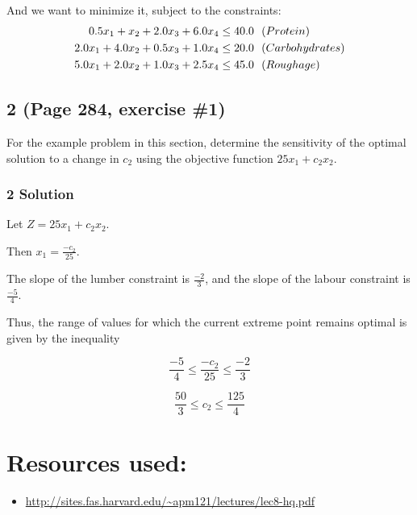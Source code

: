 \documentclass[]{article}
\providecommand{\tightlist}{%
  \setlength{\itemsep}{0pt}\setlength{\parskip}{0pt}}
\begin{document}
And we want to minimize it, subject to the constraints: \begin{align*}
0.5x_1 + x_2 + 2.0x_3 + 6.0x_4 &\leq 40.0 \ \ \text(Protein) \\
2.0x_1 + 4.0x_2 + 0.5x_3 + 1.0x_4 &\leq 20.0 \ \ \text(Carbohydrates) \\
5.0x_1 + 2.0x_2 + 1.0x_3 + 2.5x_4 &\leq 45.0 \ \ \text(Roughage)
\end{align*}

\hypertarget{page-284-exercise-1}{%
\subsection{2 (Page 284, exercise \#1)}\label{page-284-exercise-1}}

For the example problem in this section, determine the sensitivity of
the optimal solution to a change in \(c_2\) using the objective function
\(25x_1 + c_2x_2\).

\hypertarget{solution-1}{%
\subsubsection{2 Solution}\label{solution-1}}

Let \(Z = 25x_1 + c_2x_2\).

Then \(x_1 = \frac{-c_2}{25}\).

The slope of the lumber constraint is \(\frac{-2}{3}\), and the slope of
the labour constraint is \(\frac{-5}{4}\).

Thus, the range of values for which the current extreme point remains
optimal is given by the inequality

\[
\frac{-5}{4} \leq \frac{-c_2}{25} \leq \frac{-2}{3}
\]

\[
\frac{50}{3} \leq c_2 \leq \frac{125}{4}
\]

\hypertarget{resources-used}{%
\section{Resources used:}\label{resources-used}}

\begin{itemize}
\tightlist
\item
  \url{http://sites.fas.harvard.edu/~apm121/lectures/lec8-hq.pdf}
\end{itemize}
\end{document}
